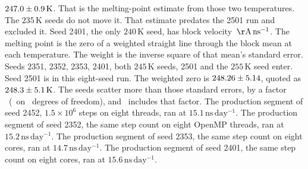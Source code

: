 $247.0\pm 0.9\,\mathrm{K}$.
That is the melting-point estimate from those two temperatures.
The $235\,\mathrm{K}$ seeds do not move it.
That estimate predates the 2501 run and excluded it.
Seed 2401, the only $240\,\mathrm{K}$ seed, has block velocity
\GateBlockTwoFourZeroOne$\,\mathrm{\AA\,ns^{-1}}$.
The melting point is the zero of a weighted straight line through
the block mean at each temperature.
The weight is the inverse square of that mean's standard error.
Seeds 2351, 2352, 2353, 2401, both $245\,\mathrm{K}$ seeds, 2501
and the $255\,\mathrm{K}$ seed enter.
Seed 2501 is in this eight-seed run.
The weighted zero is $248.26\pm 5.14$, quoted as
$248.3\pm 5.1\,\mathrm{K}$.
The seeds scatter more than those standard errors, by a factor
\GateScale\ (\GateChi\ on \GateDof\ degrees of freedom), and
\GateZeroErrOne\ includes that factor.
The production segment of seed 2452, $1.5\times 10^{6}$ steps on
eight threads, ran at $15.1\,\mathrm{ns\,day^{-1}}$.
The production segment of seed 2352, the same step count on
eight OpenMP threads, ran at $15.2\,\mathrm{ns\,day^{-1}}$.
The production segment of seed 2353, the same step count on
eight cores, ran at $14.7\,\mathrm{ns\,day^{-1}}$.
The production segment of seed 2401, the same step count on
eight cores, ran at $15.6\,\mathrm{ns\,day^{-1}}$.

